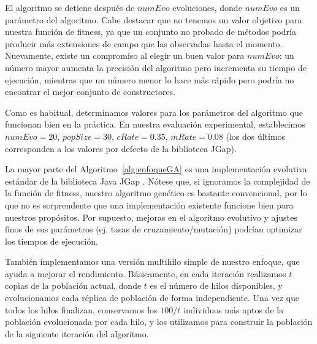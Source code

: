 El algoritmo se detiene después de $numEvo$ evoluciones, donde $numEvo$ es un parámetro del algoritmo. 
Cabe destacar que no tenemos un valor objetivo para nuestra función de fitness, 
ya que un conjunto no probado de métodos podría producir más extensiones de campo que las observadas hasta el momento. 
Nuevamente, existe un compromiso al elegir un buen valor para $numEvo$: un número mayor aumenta la precisión del algoritmo pero incrementa su tiempo de ejecución, 
mientras que un número menor lo hace más rápido pero podría no encontrar el mejor conjunto de constructores.

Como es habitual, determinamos valores para los parámetros del algoritmo que funcionan bien en la práctica. 
En nuestra evaluación experimental, establecimos $numEvo=20$, $popSize=30$, $cRate=0.35$, $mRate=0.08$ 
(los dos últimos corresponden a los valores por defecto de la biblioteca JGap).

La mayor parte del Algoritmo~\ref{alg:enfoqueGA} es una implementación evolutiva estándar de la biblioteca Java JGap \cite{jgap}. 
Nótese que, si ignoramos la complejidad de la función de fitness, nuestro algoritmo genético es bastante convencional, 
por lo que no es sorprendente que una implementación existente funcione bien para nuestros propósitos.
Por supuesto, mejoras en el algoritmo evolutivo y ajustes finos de sus parámetros (ej. tasas de cruzamiento/mutación) podrían optimizar los tiempos de ejecución.

También implementamos una versión multihilo simple de nuestro enfoque, 
que ayuda a mejorar el rendimiento. 
Básicamente, en cada iteración realizamos $t$ copias de la población actual, 
donde $t$ es el número de hilos disponibles, 
y evolucionamos cada réplica de población de forma independiente. 
Una vez que todos los hilos finalizan, conservamos los $100/t$ individuos más aptos de la población evolucionada por cada hilo, 
y los utilizamos para construir la población de la siguiente iteración del algoritmo.



